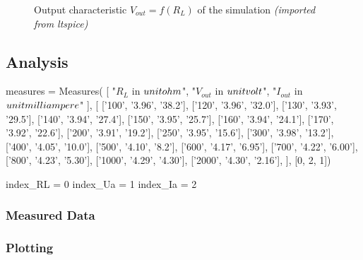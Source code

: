 \begin{figure}[H]
    \centering
    \caption{Output characteristic \textbf{$V_{out} = f(R_L)$} of the simulation \textit{(imported from ltspice)}}
\end{figure}

\subsection{Analysis}

\begin{sagesilent}
    measures = Measures(
        [
            "$R_L$ in $\\unit{\\ohm}$",
            "$V_{out}$ in $\\unit{\\volt}$", 
            "$I_{out}$ in $\\unit{\\milli\\ampere}$"
        ], [
            ['100', '3.96', '38.2'],
            ['120', '3.96', '32.0'],
            ['130', '3.93', '29.5'],
            ['140', '3.94', '27.4'],
            ['150', '3.95', '25.7'],
            ['160', '3.94', '24.1'],
            ['170', '3.92', '22.6'],
            ['200', '3.91', '19.2'],
            ['250', '3.95', '15.6'],
            ['300', '3.98', '13.2'],
            ['400', '4.05', '10.0'],
            ['500', '4.10', '8.2'],
            ['600', '4.17', '6.95'],
            ['700', '4.22', '6.00'],
            ['800', '4.23', '5.30'],
            ['1000', '4.29', '4.30'],
            ['2000', '4.30', '2.16'],
    ], [0, 2, 1])

    index_RL = 0
    index_Ua = 1
    index_Ia = 2
\end{sagesilent}

\subsubsection{Measured Data}

\begin{table}
    \centering
    \renewcommand{\arraystretch}{1.2}
\end{table}

\subsubsection{Plotting}

